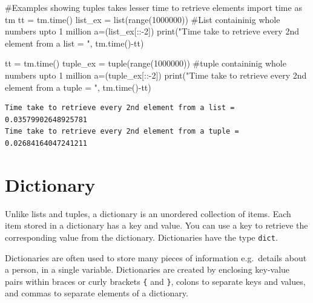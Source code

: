 \documentclass[
  letterpaper,
  DIV=11,
  numbers=noendperiod]{scrreprt}
\newenvironment{Shaded}{\begin{snugshade}}{\end{snugshade}}
\newcommand{\BuiltInTok}[1]{\textcolor[rgb]{0.00,0.23,0.31}{#1}}
\newcommand{\CommentTok}[1]{\textcolor[rgb]{0.37,0.37,0.37}{#1}}
\newcommand{\DecValTok}[1]{\textcolor[rgb]{0.68,0.00,0.00}{#1}}
\newcommand{\ImportTok}[1]{\textcolor[rgb]{0.00,0.46,0.62}{#1}}
\newcommand{\NormalTok}[1]{\textcolor[rgb]{0.00,0.23,0.31}{#1}}
\newcommand{\OperatorTok}[1]{\textcolor[rgb]{0.37,0.37,0.37}{#1}}
\newcommand{\StringTok}[1]{\textcolor[rgb]{0.13,0.47,0.30}{#1}}
\begin{document}
\begin{Shaded}
\begin{Highlighting}[]
\CommentTok{\#Examples showing tuples takes lesser time to retrieve elements}
\ImportTok{import}\NormalTok{ time }\ImportTok{as}\NormalTok{ tm}
\NormalTok{tt }\OperatorTok{=}\NormalTok{ tm.time()}
\NormalTok{list\_ex }\OperatorTok{=} \BuiltInTok{list}\NormalTok{(}\BuiltInTok{range}\NormalTok{(}\DecValTok{1000000}\NormalTok{)) }\CommentTok{\#List containinig whole numbers upto 1 million}
\NormalTok{a}\OperatorTok{=}\NormalTok{(list\_ex[::}\OperatorTok{{-}}\DecValTok{2}\NormalTok{])}
\BuiltInTok{print}\NormalTok{(}\StringTok{"Time take to retrieve every 2nd element from a list = "}\NormalTok{, tm.time()}\OperatorTok{{-}}\NormalTok{tt)}

\NormalTok{tt }\OperatorTok{=}\NormalTok{ tm.time()}
\NormalTok{tuple\_ex }\OperatorTok{=} \BuiltInTok{tuple}\NormalTok{(}\BuiltInTok{range}\NormalTok{(}\DecValTok{1000000}\NormalTok{)) }\CommentTok{\#tuple containinig whole numbers upto 1 million}
\NormalTok{a}\OperatorTok{=}\NormalTok{(tuple\_ex[::}\OperatorTok{{-}}\DecValTok{2}\NormalTok{])}
\BuiltInTok{print}\NormalTok{(}\StringTok{"Time take to retrieve every 2nd element from a tuple = "}\NormalTok{, tm.time()}\OperatorTok{{-}}\NormalTok{tt)}
\end{Highlighting}
\end{Shaded}

\begin{verbatim}
Time take to retrieve every 2nd element from a list =  0.03579902648925781
Time take to retrieve every 2nd element from a tuple =  0.02684164047241211
\end{verbatim}

\hypertarget{dictionary}{%
\section{Dictionary}\label{dictionary}}

Unlike lists and tuples, a dictionary is an unordered collection of
items. Each item stored in a dictionary has a key and value. You can use
a key to retrieve the corresponding value from the dictionary.
Dictionaries have the type \texttt{dict}.

Dictionaries are often used to store many pieces of information
e.g.~details about a person, in a single variable. Dictionaries are
created by enclosing key-value pairs within braces or curly brackets
\texttt{\{} and \texttt{\}}, colons to separate keys and values, and
commas to separate elements of a dictionary.
\end{document}
